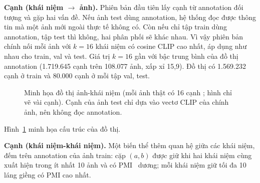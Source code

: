 \textbf{Cạnh  (khái niệm $\to$ ảnh).} Phiên bản đầu tiên lấy cạnh từ annotation đối tượng và gặp hai vấn đề. Nếu ảnh test dùng annotation, hệ thống đọc được thông tin mà một ảnh mới ngoài thực tế không có. Còn nếu chỉ tập train dùng annotation, tập test thì không, hai phân phối sẽ khác nhau. Vì vậy phiên bản chính nối mỗi ảnh với $k = 16$ khái niệm có cosine CLIP cao nhất, áp dụng như nhau cho train, val và test. Giá trị $k = 16$ gần với bậc trung bình của đồ thị annotation (1.719.645 cạnh trên 108.077 ảnh, xấp xỉ 15,9). Đồ thị có 1.569.232 cạnh ở train và 80.000 cạnh ở mỗi tập val, test.

\begin{figure}[t]
\centering
{}
\caption{Minh họa đồ thị ảnh-khái niệm (mỗi ảnh thật có 16 cạnh ; hình chỉ vẽ vài cạnh). Cạnh của ảnh test chỉ dựa vào vectơ CLIP của chính ảnh, nên không đọc annotation.}
\label{fig:graph}
\end{figure}

Hình~\ref{fig:graph} minh họa cấu trúc của đồ thị.

\textbf{Cạnh  (khái niệm-khái niệm).} Một biến thể thêm quan hệ giữa các khái niệm, đếm trên annotation của ảnh train: cặp $(a, b)$ được giữ khi hai khái niệm cùng xuất hiện trong ít nhất 10 ảnh và có PMI~\cite{church1990pmi} dương; mỗi khái niệm giữ tối đa 10 láng giềng có PMI cao nhất.

